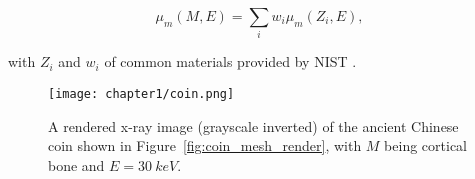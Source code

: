 \begin{equation}
  \mu_m(M, E) = \sum_i w_i \mu_m(Z_i, E),
  \label{eq:mu_weighted}
\end{equation}

\noindent with {$Z_i$} and {$w_i$} of common materials provided by NIST \cite{hubbell1982photon}.

\begin{figure}
  \centering
  \texttt{[image: chapter1/coin.png]}
  \caption{A rendered x-ray image (grayscale inverted) of the ancient Chinese coin shown in Figure~\ref{fig:coin_mesh_render}, with $M$ being cortical bone and $E = \qty{30}{keV}$.}
\end{figure}





  






